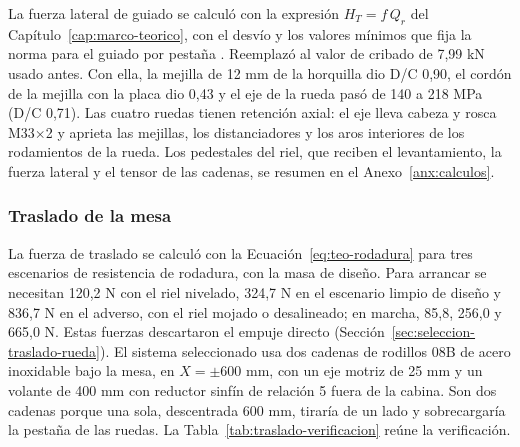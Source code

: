 La fuerza lateral de guiado se calculó con la expresión $H_T=f\,Q_r$ del Capítulo~\ref{cap:marco-teorico}, con el desvío y los valores mínimos que fija la norma para el guiado por pestaña \cite{en19913}. Reemplazó al valor de cribado de 7,99 kN usado antes. Con ella, la mejilla de 12 mm de la horquilla dio D/C 0,90, el cordón de la mejilla con la placa dio 0,43 y el eje de la rueda pasó de 140 a 218 MPa (D/C 0,71). Las cuatro ruedas tienen retención axial: el eje lleva cabeza y rosca M33$\times$2 y aprieta las mejillas, los distanciadores y los aros interiores de los rodamientos de la rueda. Los pedestales del riel, que reciben el levantamiento, la fuerza lateral y el tensor de las cadenas, se resumen en el Anexo~\ref{anx:calculos}.

\subsubsection{Traslado de la mesa}
\label{sec:dimensionamiento-traslado}

La fuerza de traslado se calculó con la Ecuación~\eqref{eq:teo-rodadura} para tres escenarios de resistencia de rodadura, con la masa de diseño. Para arrancar se necesitan 120,2 N con el riel nivelado, 324,7 N en el escenario limpio de diseño y 836,7 N en el adverso, con el riel mojado o desalineado; en marcha, 85,8, 256,0 y 665,0 N. Estas fuerzas descartaron el empuje directo (Sección~\ref{sec:seleccion-traslado-rueda}). El sistema seleccionado usa dos cadenas de rodillos 08B de acero inoxidable bajo la mesa, en $X=\pm600$ mm, con un eje motriz de 25 mm y un volante de 400 mm con reductor sinfín de relación 5 fuera de la cabina. Son dos cadenas porque una sola, descentrada 600 mm, tiraría de un lado y sobrecargaría la pestaña de las ruedas. La Tabla~\ref{tab:traslado-verificacion} reúne la verificación.

